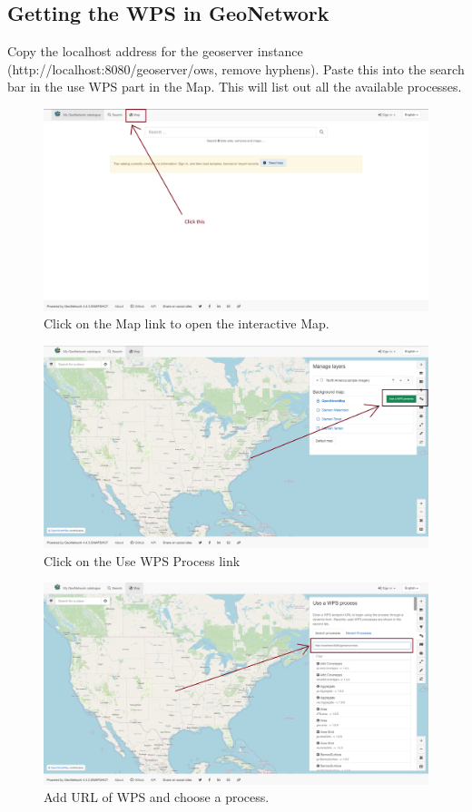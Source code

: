 \documentclass{article}
\begin{document}
        \subsection*{Getting the WPS in GeoNetwork}
        \hspace{1.5em}Copy the localhost address for the geoserver instance (http://localhost:8080/\-geoserver/ows, remove hyphens). Paste this into the search bar in the use WPS part in the Map. This will list out all the available processes.
        \begin{figure}[h!]
            \centering
            \includegraphics[width=\textwidth]{../images/Map.jpg}
            \caption{Click on the Map link to open the interactive Map.}
            \label{fig:fig-1}
        \end{figure}
        \begin{figure}[h!]
            \centering
            \includegraphics[width=\textwidth]{../images/Use WPS Process.jpg}
            \caption{Click on the Use WPS Process link}
            \label{fig:fig-2}
        \end{figure}
        \begin{figure}[h!]
            \centering
            \includegraphics[width=\textwidth]{../images/Adding URL.jpg}
            \caption{Add URL of WPS and choose a process.}
            \label{fig:fig-3}
        \end{figure}
\end{document}
